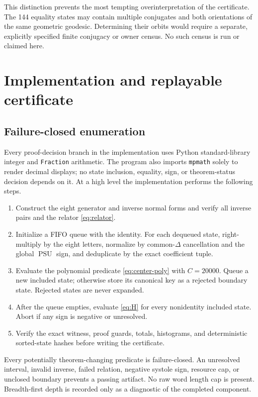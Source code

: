 \documentclass[11pt,a4paper]{article}
\theoremstyle{definition}
\newcommand{\PSU}{\operatorname{PSU}}
\begin{document}
This distinction prevents the most tempting overinterpretation of the
certificate.  The 144 equality states may contain multiple conjugates and
both orientations of the same geometric geodesic.  Determining their orbits
would require a separate, explicitly specified finite conjugacy or owner
census.  No such census is run or claimed here.

\section{Implementation and replayable certificate}
\label{sec:implementation}

\subsection{Failure-closed enumeration}

Every proof-decision branch in the implementation uses Python
standard-library integer and \texttt{Fraction} arithmetic.  The program also
imports \texttt{mpmath} solely to render decimal displays; no state inclusion,
equality, sign, or theorem-status decision depends on it.  At a high level the
implementation performs the following steps.

\begin{enumerate}[leftmargin=*,label=\arabic*.]
 \item Construct the eight generator and inverse normal forms and verify all
       inverse pairs and the relator \eqref{eq:relator}.
 \item Initialize a FIFO queue with the identity.  For each dequeued state,
       right-multiply by the eight letters, normalize by common-\(\Delta\)
       cancellation and the global \(\PSU\) sign, and deduplicate by the exact
       coefficient tuple.
 \item Evaluate the polynomial predicate \eqref{eq:center-poly} with
       \(C=20000\).  Queue a new included state; otherwise store its canonical
       key as a rejected boundary state.  Rejected states are never expanded.
 \item After the queue empties, evaluate \eqref{eq:H} for every nonidentity
       included state.  Abort if any sign is negative or unresolved.
 \item Verify the exact witness, proof guards, totals, histograms, and
       deterministic sorted-state hashes before writing the certificate.
\end{enumerate}

Every potentially theorem-changing predicate is failure-closed.  An
unresolved interval, invalid inverse, failed relation, negative systole sign,
resource cap, or unclosed boundary prevents a passing artifact.  No raw word
length cap is present.  Breadth-first depth is recorded only as a diagnostic
of the completed component.
\end{document}
